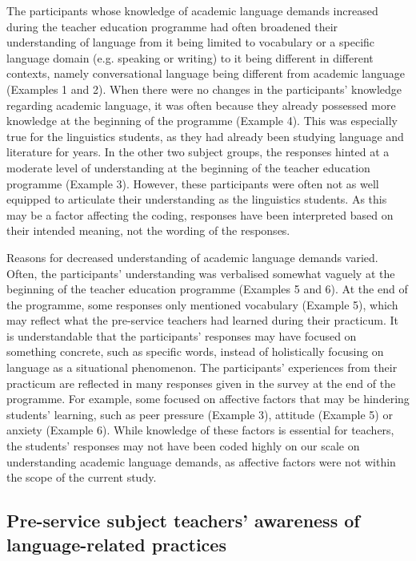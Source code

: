 \documentclass[output=paper]{langscibook}
\begin{document}
The participants whose knowledge of academic language demands increased during the teacher education programme had often broadened their understanding of language from it being limited to vocabulary or a specific language domain (e.g. speaking or writing) to it being different in different contexts, namely conversational language being different from academic language (Examples 1 and 2). When there were no changes in the participants’ knowledge regarding academic language, it was often because they already possessed more knowledge at the beginning of the programme (Example 4). This was especially true for the linguistics students, as they had already been studying language and literature for years. In the other two subject groups, the responses hinted at a moderate level of understanding at the beginning of the teacher education programme (Example 3). However, these participants were often not as well equipped to articulate their understanding as the linguistics students. As this may be a factor affecting the coding, responses have been interpreted based on their intended meaning, not the wording of the responses.

Reasons for decreased understanding of academic language demands varied. Often, the participants’ understanding was verbalised somewhat vaguely at the beginning of the teacher education programme (Examples 5 and 6). At the end of the programme, some responses only mentioned vocabulary (Example 5), which may reflect what the pre-service teachers had learned during their practicum. It is understandable that the participants’ responses may have focused on something concrete, such as specific words, instead of holistically focusing on language as a situational phenomenon. The participants’ experiences from their practicum are reflected in many responses given in the survey at the end of the programme. For example, some focused on affective factors that may be hindering students’ learning, such as peer pressure (Example 3), attitude (Example 5) or anxiety (Example 6). While knowledge of these factors is essential for teachers, the students’ responses may not have been coded highly on our scale on understanding academic language demands, as affective factors were not within the scope of the current study.

\subsection{Pre-service subject teachers’ awareness of language-related practices}\label{sec:heikkola:5.2}
\end{document}
